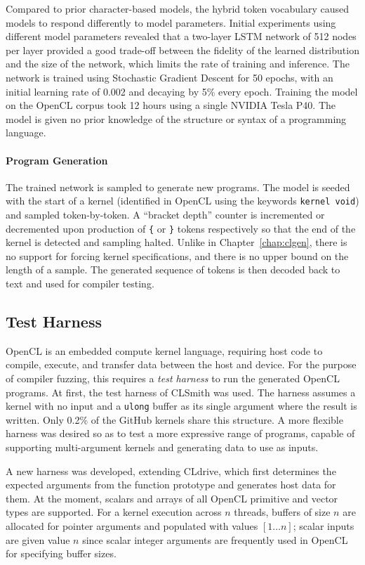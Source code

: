 Compared to prior character-based models, the hybrid token vocabulary caused models to respond differently to model parameters. Initial experiments using different model parameters revealed that a two-layer LSTM network of 512 nodes per layer provided a good trade-off between the fidelity of the learned distribution and the size of the network, which limits the rate of training and inference. The network is trained using Stochastic Gradient Descent for 50 epochs, with an initial learning rate of 0.002 and decaying by 5\% every epoch. Training the model on the OpenCL corpus took 12 hours using a single NVIDIA Tesla P40. The model is given no prior knowledge of the structure or syntax of a programming language.


\paragraph*{Program Generation}

The trained network is sampled to generate new programs. The model is seeded with the start of a kernel (identified in OpenCL using the keywords \texttt{kernel void}) and sampled token-by-token. A ``bracket depth'' counter is incremented or decremented upon production of \texttt{\{} or \texttt{\}} tokens respectively so that the end of the kernel is detected and sampling halted. Unlike in Chapter~\ref{chap:clgen}, there is no support for forcing kernel specifications, and there is no upper bound on the length of a sample. The generated sequence of tokens is then decoded back to text and used for compiler testing.


\subsection{Test Harness\label{sec:test-harness}}

OpenCL is an embedded compute kernel language, requiring host code to compile, execute, and transfer data between the host and device. For the purpose of compiler fuzzing, this requires a \emph{test harness} to run the generated OpenCL programs. At first, the test harness of CLSmith was used. The harness assumes a kernel with no input and a \texttt{ulong} buffer as its single argument where the result is written. Only 0.2\% of the GitHub kernels share this structure. A more flexible harness was desired so as to test a more expressive range of programs, capable of supporting multi-argument kernels and generating data to use as inputs.

A new harness was developed, extending CLdrive, which first determines the expected arguments from the function prototype and generates host data for them. At the moment, scalars and arrays of all OpenCL primitive and vector types are supported. For a kernel execution across $n$ threads, buffers of size $n$ are allocated for pointer arguments and populated with values {$[1 \ldots n]$}; scalar inputs are given value $n$ since scalar integer arguments are frequently used in OpenCL for specifying buffer sizes.


